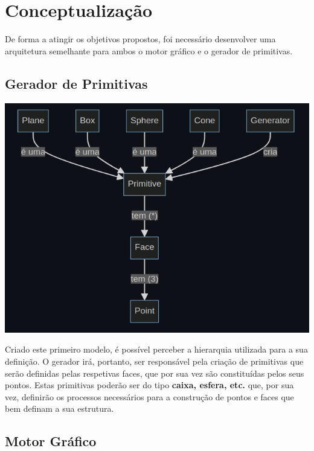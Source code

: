 \section{Conceptualização}

De forma a atingir os objetivos propostos, foi necessário desenvolver
uma arquitetura semelhante para ambos o motor gráfico e o gerador de
primitivas.

\subsection{Gerador de Primitivas}

\begin{center}
    \includegraphics[width=\textwidth]{imgs/gendom.png}
    \label{fig:gendom}
\end{center}

\noindent
Criado este primeiro modelo, é possível perceber a hierarquia utilizada
para a sua definição.\newline
\break
\noindent
O gerador irá, portanto, ser responsável pela criação de primitivas que
serão definidas pelas respetivas faces, que por sua vez são constituídas
pelos seus pontos.\newline
\break
\noindent
Estas primitivas poderão ser do tipo \textbf{caixa, esfera, etc.} que,
por sua vez, definirão os processos necessários para a construção de pontos
e faces que bem definam a sua estrutura.

\subsection{Motor Gráfico}

